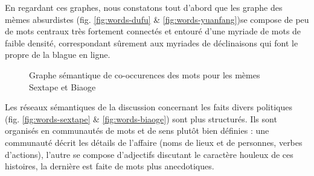 En regardant ces graphes, nous constatons tout d{\textquoteright}abord que les graphe des m\`emes absurdistes (fig. \ref{fig:words-dufu} \& \ref{fig:words-yuanfang})se compose de peu de mots centraux tr\`es fortement connect\'es et entour\'e d{\textquoteright}une myriade de mots de faible densit\'e, correspondant s\^urement aux myriades de d\'eclinaisons qui font le propre de la blague en ligne.  

\begin{figure}[h!]
    \centering
    
  \caption{
    Graphe s\'emantique de co-occurences des mots pour les m\`emes Sextape et Biaoge
  }
\end{figure}


Les r\'eseaux s\'emantiques de la discussion concernant les faits divers politiques (fig. \ref{fig:words-sextape} \& \ref{fig:words-biaoge}) sont plus structur\'es. Ils sont organis\'es en communaut\'es de mots et de sens plut\^ot bien d\'efinies : une communaut\'e d\'ecrit les d\'etails de l{\textquoteright}affaire (noms de lieux et de personnes, verbes d{\textquoteright}actions), l{\textquoteright}autre se compose d{\textquoteright}adjectifs discutant le caract\`ere houleux de ces histoires, la derni\`ere est faite de mots plus anecdotiques.


